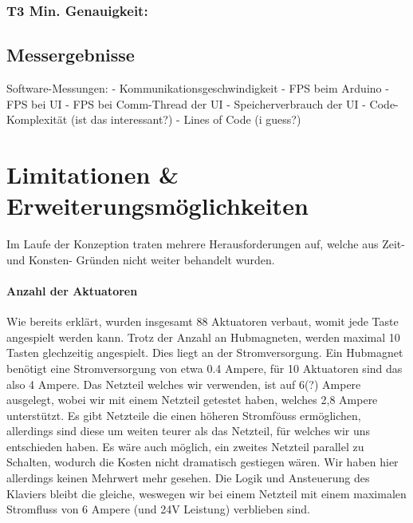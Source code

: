 \subsubsection{T3 Min. Genauigkeit:}




\subsection{Messergebnisse} \label{tests-messungen}

Software-Messungen: \newline
- Kommunikationsgeschwindigkeit \newline
- FPS beim Arduino \newline
- FPS bei UI \newline
- FPS bei Comm-Thread der UI \newline
- Speicherverbrauch der UI \newline
- Code-Komplexität (ist das interessant?) \newline
- Lines of Code (i guess?) \newline





\section{Limitationen \& Erweiterungsmöglichkeiten} \label{ergebnisse-limitationen}


Im Laufe der Konzeption traten mehrere Herausforderungen auf, welche aus Zeit- und Konsten- Gründen nicht weiter
behandelt wurden.
\paragraph{Anzahl der Aktuatoren}
Wie bereits erklärt, wurden insgesamt 88 Aktuatoren verbaut, womit jede Taste angespielt werden kann. Trotz der Anzahl an
Hubmagneten, werden maximal 10 Tasten glechzeitig angespielt. Dies liegt an der Stromversorgung. Ein Hubmagnet benötigt
eine Stromversorgung von etwa 0.4 Ampere, für 10 Aktuatoren sind das also 4 Ampere. Das Netzteil welches wir verwenden, ist auf
6(?) Ampere ausgelegt, wobei wir mit einem Netzteil getestet haben, welches 2,8 Ampere unterstützt. Es gibt Netzteile die
einen höheren Stromföuss ermöglichen, allerdings sind diese um weiten teurer als das Netzteil, für welches wir uns entschieden haben.
Es wäre auch möglich, ein zweites Netzteil parallel zu Schalten, wodurch die Kosten nicht dramatisch gestiegen wären.
Wir haben hier allerdings keinen Mehrwert mehr gesehen. Die Logik und Ansteuerung des Klaviers bleibt die gleiche, weswegen
wir bei einem Netzteil mit einem maximalen Stromfluss von 6 Ampere (und 24V Leistung) verblieben sind.

